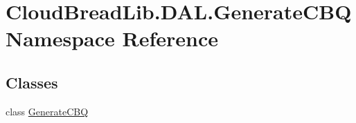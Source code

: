 \hypertarget{namespace_cloud_bread_lib_1_1_d_a_l_1_1_generate_c_b_q}{}\section{Cloud\+Bread\+Lib.\+D\+A\+L.\+Generate\+C\+BQ Namespace Reference}
\label{namespace_cloud_bread_lib_1_1_d_a_l_1_1_generate_c_b_q}
\subsection*{Classes}
\begin{DoxyCompactItemize}
\item 
class \hyperlink{class_cloud_bread_lib_1_1_d_a_l_1_1_generate_c_b_q_1_1_generate_c_b_q}{Generate\+C\+BQ}
\end{DoxyCompactItemize}
